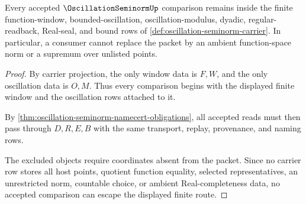 \begin{theorem}
\label{thm:oscillation-seminorm-window-nonescape}
Every accepted $\OscillationSeminormUp$ comparison remains inside the finite function-window, bounded-oscillation, oscillation-modulus, dyadic, regular-readback, Real-seal, and bound rows of \autoref{def:oscillation-seminorm-carrier}. In particular, a consumer cannot replace the packet by an ambient function-space norm or a supremum over unlisted points.
\end{theorem}
\begin{proof}
By carrier projection, the only window data is $F,W$, and the only oscillation data is $O,M$. Thus every comparison begins with the displayed finite window and the oscillation rows attached to it.

By \autoref{thm:oscillation-seminorm-namecert-obligations}, all accepted reads must then pass through $D,R,E,B$ with the same transport, replay, provenance, and naming rows.

The excluded objects require coordinates absent from the packet. Since no carrier row stores all host points, quotient function equality, selected representatives, an unrestricted norm, countable choice, or ambient Real-completeness data, no accepted comparison can escape the displayed finite route.
\end{proof}





